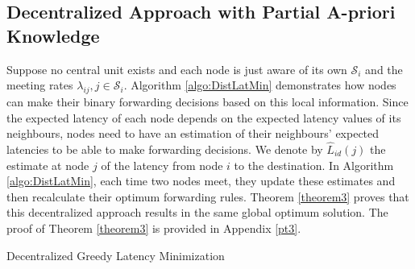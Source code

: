 \documentclass[journal,onecolumn,11pt]{IEEEtran}
\theoremstyle{plain}
\theoremstyle{definition}
\begin{document}
\subsection{Decentralized Approach with Partial A-priori Knowledge}\label{dec_partial}
Suppose no central unit exists and each node is just aware of its own
$\mathcal{S}_i$ and the meeting rates $\lambda_{ij}, j\in
\mathcal{S}_i$. Algorithm \ref{algo:DistLatMin} demonstrates how nodes
can make their binary forwarding decisions based on this local
information. Since the expected latency of each node depends on the
expected latency values of its neighbours, nodes need to have an
estimation of their neighbours' expected latencies to be able to make
forwarding decisions. We denote by $\widehat{L}_{id}(j)$ the estimate
at node $j$ of the latency from node $i$ to the destination. In
Algorithm \ref{algo:DistLatMin}, each time two nodes meet, they update
these estimates and then recalculate their optimum forwarding rules. Theorem
\ref{theorem3} proves that this decentralized approach results in the
same global optimum solution. The proof of Theorem \ref{theorem3} is provided in Appendix \ref{pt3}.
\begin{algorithm}[!htb]
\caption{Decentralized Greedy Latency Minimization} \label{algo:DistLatMin}
\begin{spacing}{1.0}
\begin{algorithmic}[1]
		\vspace{3mm}
			\vspace{0.2cm}
		\ENDWHILE
\end{algorithmic}
\end{spacing}
\end{algorithm}
\end{document}
